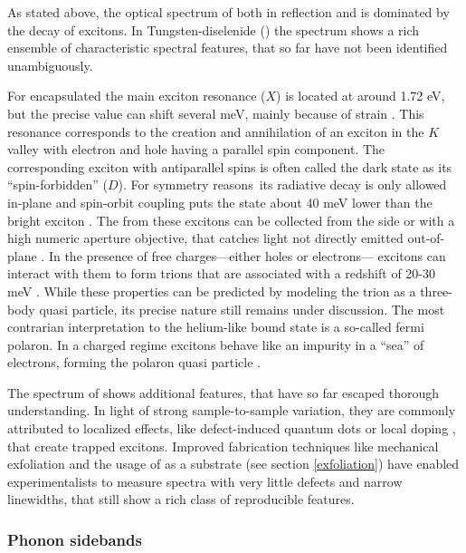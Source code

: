 As stated above, the optical spectrum of \tmds both in reflection and \pl is dominated by the decay of excitons. In Tungsten-diselenide (\wse\!) the \pl spectrum shows a rich ensemble of characteristic spectral features, that so far have not been identified unambiguously. 

For \hbng encapsulated \wse the main exciton resonance ($X$) is located at around 1.72 eV, but the precise value can shift several meV, mainly because of strain \cite{zhu_strain_2013}. This resonance corresponds to the creation and annihilation of an exciton in the $K$ valley with electron and hole having a parallel spin component. The corresponding exciton with antiparallel spins is often called the dark state as its ``spin-forbidden'' ($D$). For symmetry reasons\textregistered\ its radiative decay is only allowed in-plane and spin-orbit coupling puts the state about 40 meV lower than the bright exciton \cite{echeverry_splitting_2016}. The \pl from these excitons can be collected from the side or with a high numeric aperture objective, that catches light not directly emitted out-of-plane \cite{robert_fine_2017, wang_-plane_2017}. In the presence of free charges---either holes or electrons--- excitons can interact with them to form trions that are associated with a redshift of 20-30 meV \cite{courtade_charged_2017}. While these properties can be predicted by modeling the trion as a three-body quasi particle, its precise nature still remains under discussion. The most contrarian interpretation to the helium-like bound state is a so-called fermi polaron. In a charged regime excitons behave like an impurity in a ``sea'' of electrons, forming the polaron quasi particle \cite{sidler_fermi_2016, efimkin_many-body_2017,schmidt_fermi_2012}.

The spectrum of \wse shows additional features, that have so far escaped thorough understanding. In light of strong sample-to-sample variation, they are commonly attributed to localized effects, like defect-induced quantum dots or local doping \cite{kato_optical_2014, zhang_defect_2017}, that create trapped excitons. Improved fabrication techniques like mechanical exfoliation and the usage of \hbng as a substrate (see section \ref{exfoliation}) have enabled experimentalists to measure spectra with very little defects and narrow linewidths, that still show a rich class of reproducible features.

\subsubsection{Phonon sidebands}\label{sidebands}

